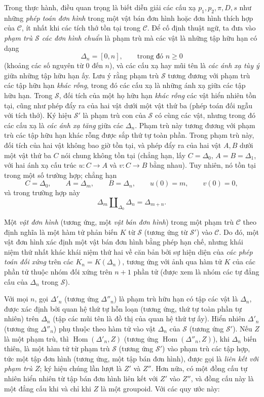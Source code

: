 Trong thực hành, điều quan trọng là biết diễn giải các cấu xạ
$p_1,p_2,\pi,D,s$ như những \emph{phép toán đơn hình} trong một vật bán đơn
hình hoặc đơn hình thích hợp của $\mathcal C$, ít nhất khi các tích thớ tồn
tại trong $\mathcal C$. Để cố định thuật ngữ, ta đưa vào \emph{phạm trù
$\mathcal S$ các đơn hình chuẩn} là phạm trù mà các vật là những tập hữu hạn
có dạng
\[
  \Delta_n=[0,n],\qquad\text{trong đó }n\geq 0
\]
(khoảng các số nguyên từ $0$ đến $n$), và các cấu xạ hay mũi tên là
\emph{các ánh xạ tùy ý} giữa những tập hữu hạn ấy. Lưu ý rằng phạm trù
$\mathcal S$ tương đương với phạm trù các tập hữu hạn \emph{khác rỗng}, trong
đó các cấu xạ là những ánh xạ giữa các tập hữu hạn. Trong $\mathcal S$, đối
tích của một họ hữu hạn \emph{khác rỗng} các vật hiển nhiên tồn tại, cũng như
phép đẩy ra của hai vật dưới một vật thứ ba (phép toán đối ngẫu với tích thớ).
Ký hiệu $\mathcal S'$ là phạm trù con của $\mathcal S$ có cùng các vật, nhưng
trong đó các cấu xạ là \emph{các ánh xạ tăng} giữa các $\Delta_n$. Phạm trù
này tương đương với phạm trù các tập hữu hạn khác rỗng được sắp thứ tự toàn
phần. Trong phạm trù này,
đối tích của hai vật không bao giờ tồn tại, và phép đẩy ra của hai vật $A,B$
dưới một vật thứ ba $C$ nói chung không tồn tại (chẳng hạn, lấy
$C=\Delta_0$, $A=B=\Delta_1$, với hai ánh xạ cấu trúc $u:C\to A$ và
$v:C\to B$ bằng nhau). Tuy nhiên, nó tồn tại trong một số trường hợp; chẳng
hạn
\[
  C=\Delta_0,\qquad A=\Delta_m,\qquad B=\Delta_n,\qquad
  u(0)=m,\qquad v(0)=0,
\]
và trong trường hợp này
\[
  \Delta_m\amalg_{\Delta_0}\Delta_n=\Delta_{m+n}.
\]

Một \emph{vật đơn hình} (tương ứng, một \emph{vật bán đơn hình}) trong một
phạm trù $\mathcal C$ theo định nghĩa là một hàm tử phản biến $K$ từ
$\mathcal S$ (tương ứng từ $\mathcal S'$) vào $\mathcal C$. Do đó, một vật
đơn hình xác định một vật bán đơn hình bằng phép hạn chế, nhưng khái niệm thứ
nhất khác khái niệm thứ hai về căn bản bởi sự hiện diện của \emph{các phép
toán đối xứng} trên các $K_n=K(\Delta_n)$, tương ứng với ảnh qua hàm tử $K$
của các phần tử thuộc nhóm đối xứng trên $n+1$ phần tử (được xem là nhóm các
tự đẳng cấu của $\Delta_n$ trong $\mathcal S$).

Với mọi $n$, gọi $\Delta'_n$ (tương ứng $\Delta''_n$) là phạm trù hữu hạn có
tập các vật là $\Delta_n$, được xác định bởi quan hệ thứ tự hỗn loạn (tương
ứng, thứ tự toàn phần tự nhiên) trên $\Delta_n$ (tập các mũi tên là đồ thị của
quan hệ thứ tự ấy). Hiển nhiên $\Delta'_n$ (tương ứng $\Delta''_n$) phụ thuộc
theo hàm tử vào vật $\Delta_n$ của $\mathcal S$ (tương ứng $\mathcal S'$).
Nếu $Z$ là một phạm trù, thì $\operatorname{Hom}(\Delta'_n,Z)$ (tương ứng
$\operatorname{Hom}(\Delta''_n,Z)$), khi $\Delta_n$ biến thiên, là một hàm tử
từ phạm trù $\mathcal S$ (tương ứng $\mathcal S'$) vào phạm trù các tập hợp,
tức một tập đơn hình (tương ứng, một tập bán đơn hình), được gọi là
\emph{liên kết với phạm trù $Z$}; ký hiệu chúng lần lượt là $Z'$ và $Z''$.
Hơn nữa, có một đồng cấu tự nhiên hiển nhiên từ tập bán đơn hình liên kết
với $Z'$ vào
$Z''$, và đồng cấu này là một đẳng cấu khi và chỉ khi $Z$ là một groupoid. Với
các quy ước này:

